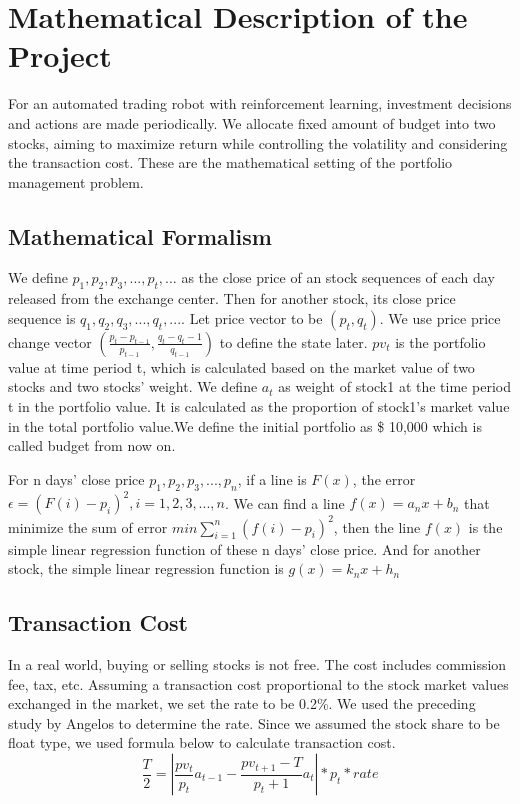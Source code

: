 \chapter{Mathematical Description of the Project}
\label{Ch:mathematical description}
For an automated trading robot with reinforcement learning, investment decisions and actions are made periodically. We allocate fixed amount of budget into two stocks, aiming to maximize return while controlling the volatility and considering the transaction cost. These are the mathematical setting of the portfolio management problem.

\section{Mathematical Formalism}
We define $p_1,p_2,p_3,...,p_t,...$ as the close price of an stock sequences of each day released from the exchange center. Then for another stock, its close price sequence is $q_1,q_2,q_3,...,q_t,...$. Let price vector to be $(p_t, q_t)$. We use price price change vector $(\frac{p_t-p_{t-1}}{p_{t-1}},\frac{q_t-q_t-1}{q_{t-1}})$ to define the state later.
$pv_t$ is the portfolio value at time period t, which is calculated based on the market value of two stocks and two stocks' weight. We define $a_t$ as weight of stock1 at the time period t in the portfolio value. It is calculated as the proportion of stock1's market value in the total portfolio value.We define the initial portfolio as \$ 10,000 which is called budget from now on.

For n days’ close price $p_1,p_2,p_3,...,p_n$, if a line is $F(x)$, the error $\epsilon=(F(i)-p_i)^2, i=1,2,3,...,n$. We can find a line $f(x)=a_nx+b_n$ that minimize the sum of error $min\sum_{i=1}^{n}(f(i)-p_i)^2$, then the line $f(x)$ is the simple linear regression function of these n days’ close price. And for another stock, the simple linear regression function is $g(x)=k_nx+h_n$


\section{Transaction Cost}
In a real world, buying or selling stocks is not free. The cost includes commission fee, tax, etc. Assuming a transaction cost proportional to the stock market values exchanged in the market, we set the rate to be 0.2\%. We used the preceding study by Angelos to determine the rate. Since we assumed the stock share to be float type, we used formula below to calculate transaction cost. 
$$\frac{T}{2} = |\frac{pv_t}{p_t}a_{t-1} - \frac{pv_{t+1}-T}{p_t+1}a_t|*p_t*rate$$


